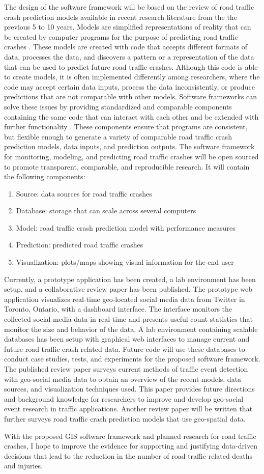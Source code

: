 The design of the software framework will be based on the review of road traffic crash prediction models available in recent research literature from the the previous 5 to 10 years. Models are simplified representations of reality that can be created by computer programs for the purpose of predicting road traffic crashes \cite{rothenberg1989model}. These models are created with code that accepts different formats of data, processes the data, and discovers a pattern or a representation of the data that can be used to predict future road traffic crashes. Although this code is able to create models, it is often implemented differently among researchers, where the code may accept certain data inputs, process the data inconsistently, or produce predictions that are not comparable with other models. Software frameworks can solve these issues by providing standardized and comparable components containing the same code that can interact with each other and be extended with further functionality \cite{edwin2014softwareframeworks}. These components ensure that programs are consistent, but flexible enough to generate a variety of comparable road traffic crash prediction models, data inputs, and prediction outputs. The software framework for monitoring, modeling, and predicting road traffic crashes will be open sourced to promote transparent, comparable, and reproducible research. It will contain the following components:

\begin{enumerate}[label=\alph*)]
	\item Source: data sources for road traffic crashes
	\item Database: storage that can scale across several computers
	\item Model: road traffic crash prediction model with performance measures
	\item Prediction: predicted road traffic crashes
	\item Visualization: plots/maps showing visual information for the end user
\end{enumerate}

Currently, a prototype application has been created, a lab environment has been setup, and a
collaborative review paper has been published. The prototype web application visualizes real-time geo-located social media data from Twitter in Toronto, Ontario, with a dashboard interface. The interface monitors the collected social media data in real-time and presents useful count statistics that monitor the size and behavior of the data. A lab environment containing scalable databases has been setup with graphical web interfaces to manage current and future road traffic crash related data. Future code will use these databases to conduct case studies, tests, and experiments for the proposed software framework. The published review paper surveys current methods of traffic event detection with geo-social media data to obtain an overview of the recent models, data sources, and visualization techniques used. This paper provides future directions and background knowledge for researchers to improve and develop geo-social event research in traffic applications. Another review paper will be written that further surveys road traffic crash prediction models that use geo-spatial data.

With the proposed GIS software framework and planned research for road traffic crashes, I hope to improve the evidence for supporting and justifying data-driven decisions that lead to the reduction in the number of road traffic related deaths and injuries.
